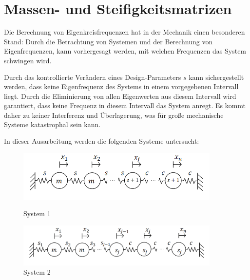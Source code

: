 \documentclass[a4paper,12pt]{report}
\newcommand{\1}{\mathds{1}}
\theoremstyle{plain} %
\theoremstyle{definition} %
\theoremstyle{remark}
\begin{document}
\chapter{Massen- und Steifigkeitsmatrizen}
\label{sec: MS Matrizen}
      Die Berechnung von Eigenkreisfrequenzen hat in der Mechanik einen besonderen Stand:
      Durch die Betrachtung von Systemen und der Berechnung von Eigenfrequenzen, kann vorhergesagt werden, mit welchen Frequenzen das System schwingen wird.

      Durch das kontrollierte Verändern eines Design-Parameters $s$ kann sichergestellt werden, dass keine Eigenfrequenz des Systems in einem vorgegebenen Intervall liegt.
      Durch die Eliminierung von allen Eigenwerten aus diesem Intervall wird garantiert, dass keine Frequenz in diesem Intervall das System anregt.
      Es kommt daher zu keiner Interferenz und Überlagerung, was für große mechanische Systeme katastrophal sein kann.

      In dieser Ausarbeitung werden die folgenden Systeme untersucht:
      \begin{figure}[ht]
            \centering
            \begin{minipage}[ht]{0.49\linewidth}
                  \centering
                  \includegraphics[width=0.9\textwidth, keepaspectratio]{./System1.png}
                  \caption{System 1}
                  \label{fig: System 1}
            \end{minipage}
            \hfill
            \begin{minipage}[ht]{0.49\linewidth}
                  \centering
                  \includegraphics[width=0.9\textwidth, keepaspectratio]{./System2.png}
                  \caption{System 2}
                  \label{fig: System 2}
            \end{minipage}
      \end{figure}
\end{document}
